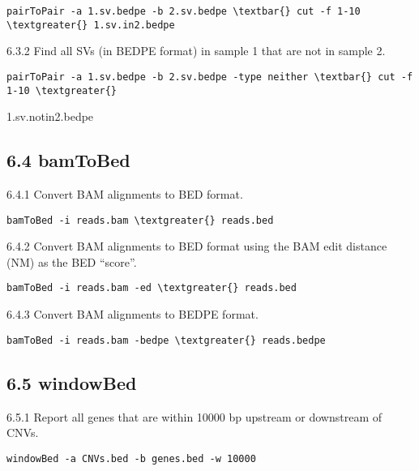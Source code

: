 \documentclass[letterpaper,10pt,english]{sphinxmanual}
\begin{document}
\begin{Verbatim}[commandchars=\\\{\}]
pairToPair -a 1.sv.bedpe -b 2.sv.bedpe \textbar{} cut -f 1-10 \textgreater{} 1.sv.in2.bedpe
\end{Verbatim}

6.3.2 Find all SVs (in BEDPE format) in sample 1 that are not in sample 2.

\begin{Verbatim}[commandchars=\\\{\}]
pairToPair -a 1.sv.bedpe -b 2.sv.bedpe -type neither \textbar{} cut -f 1-10 \textgreater{}
\end{Verbatim}

1.sv.notin2.bedpe


\subsection{6.4 bamToBed}
\label{content/example-usage:bamtobed}
6.4.1 Convert BAM alignments to BED format.

\begin{Verbatim}[commandchars=\\\{\}]
bamToBed -i reads.bam \textgreater{} reads.bed
\end{Verbatim}

6.4.2 Convert BAM alignments to BED format using the BAM edit distance (NM) as the
BED ``score''.

\begin{Verbatim}[commandchars=\\\{\}]
bamToBed -i reads.bam -ed \textgreater{} reads.bed
\end{Verbatim}

6.4.3 Convert BAM alignments to BEDPE format.

\begin{Verbatim}[commandchars=\\\{\}]
bamToBed -i reads.bam -bedpe \textgreater{} reads.bedpe
\end{Verbatim}


\subsection{6.5 windowBed}
\label{content/example-usage:windowbed}
6.5.1 Report all genes that are within 10000 bp upstream or downstream of CNVs.

\begin{Verbatim}[commandchars=\\\{\}]
windowBed -a CNVs.bed -b genes.bed -w 10000
\end{Verbatim}
\end{document}
